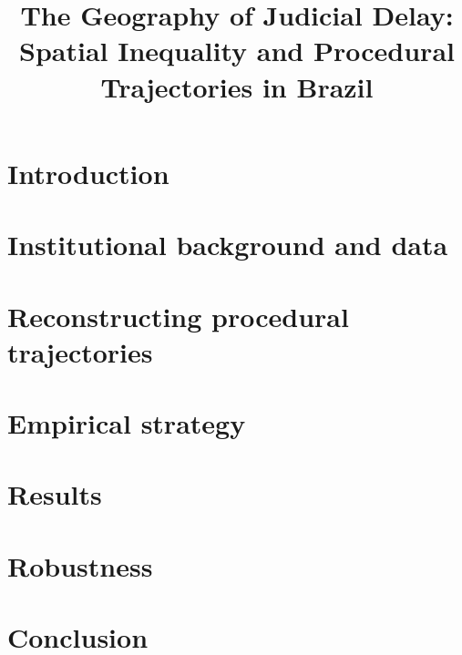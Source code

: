 \documentclass[12pt,a4paper]{article}
\title{The Geography of Judicial Delay:\\Spatial Inequality and Procedural Trajectories in Brazil}
\author{%
}
\date{}
\begin{document}
\maketitle

\begin{abstract}
\end{abstract}

\section{Introduction}

\section{Institutional background and data}

\section{Reconstructing procedural trajectories}

\section{Empirical strategy}

\section{Results}
% 

\section{Robustness}

\section{Conclusion}






\end{document}
